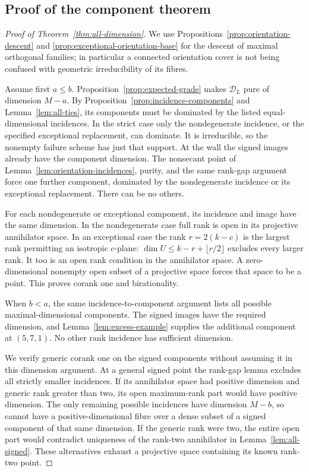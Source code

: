 \subsection{Proof of the component theorem}
\begin{proof}[Proof of Theorem~\ref{thm:all-dimension}]
We use Propositions~\ref{prop:orientation-descent} and
\ref{prop:exceptional-orientation-base} for the descent of maximal
orthogonal families; in particular a connected orientation cover
is not being confused with geometric irreducibility of its fibres.

Assume first $a\le b$. Proposition~\ref{prop:expected-grade} makes
$\mathscr D_L$ pure of dimension $M-a$. By
Proposition~\ref{prop:incidence-components} and Lemma~\ref{lem:all-ties},
its components must be dominated by the listed equal-dimensional
incidences. In the strict case only the nondegenerate incidence, or the
specified exceptional replacement, can dominate. It is irreducible,
so the nonempty failure scheme has just that support. At the wall the
signed images already have the component dimension. The nonsecant
point of Lemma~\ref{lem:orientation-incidences}, purity, and the same
rank-gap argument force one further component, dominated by the
nondegenerate incidence or its exceptional replacement. There can be
no others.

For each nondegenerate or exceptional component, its incidence and
image have the same dimension. In the nondegenerate case full rank is
open in its projective annihilator space. In an exceptional case the
rank $r=2(k-c)$ is the largest rank permitting an isotropic $c$-plane:
$\dim U\le k-r+\lfloor r/2\rfloor$ excludes every larger rank.
It too is an open rank condition in the annihilator space. A
zero-dimensional nonempty open subset of a projective space forces that
space to be a point. This proves corank one and birationality.

When $b<a$, the same incidence-to-component argument lists all possible
maximal-dimensional components. The signed images have the required
dimension, and Lemma~\ref{lem:excess-example} supplies the additional
component at $(5,7,1)$. No other rank incidence has sufficient dimension.

We verify generic corank one on the signed components without assuming
it in this dimension argument. At a general signed point the rank-gap
lemma excludes all strictly smaller incidences. If its annihilator
space had positive dimension and generic rank greater than two, its
open maximum-rank part would have positive dimension. The only
remaining possible incidences have dimension $M-b$, so cannot have a
positive-dimensional fibre over a dense subset of a signed component
of that same dimension. If the generic rank were two, the entire open
part would contradict uniqueness of the rank-two annihilator in
Lemma~\ref{lem:all-signed}. These alternatives exhaust a projective
space containing its known rank-two point.


\end{proof}

